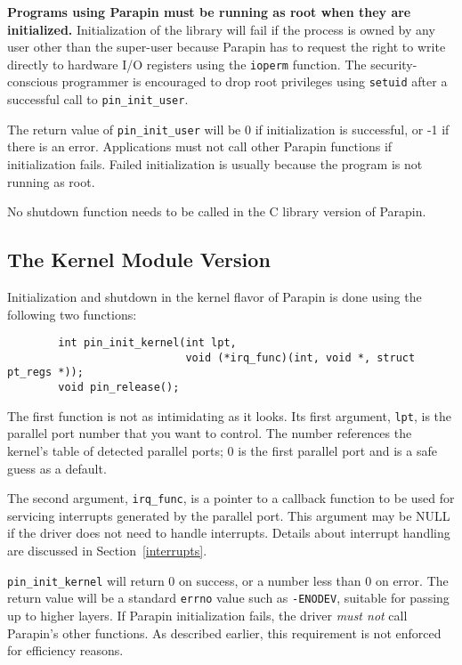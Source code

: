 \documentclass{article}
\begin{document}
{\bf Programs using Parapin must be running as root when they are
initialized.}  Initialization of the library will fail if the process
is owned by any user other than the super-user because Parapin has to
request the right to write directly to hardware I/O registers using
the {\tt ioperm} function.  The security-conscious programmer is
encouraged to drop root privileges using {\tt setuid} after a
successful call to {\tt pin\_init\_user}.

The return value of {\tt pin\_init\_user} will be 0 if initialization
is successful, or -1 if there is an error.  Applications must not call
other Parapin functions if initialization fails.  Failed
initialization is usually because the program is not running as root.

No shutdown function needs to be called in the C library version of
Parapin.


\subsection{The Kernel Module Version}

Initialization and shutdown in the kernel flavor of Parapin is done
using the following two functions:
\begin{verbatim}
        int pin_init_kernel(int lpt,
                            void (*irq_func)(int, void *, struct pt_regs *));
        void pin_release();
\end{verbatim}

The first function is not as intimidating as it looks.  Its first
argument, {\tt lpt}, is the parallel port number that you want to
control.  The number references the kernel's table of detected
parallel ports; 0 is the first parallel port and is a safe guess as a
default.

The second argument, {\tt irq\_func}, is a pointer to a callback
function to be used for servicing interrupts generated by the parallel
port.  This argument may be NULL if the driver does not need to handle
interrupts.  Details about interrupt handling are discussed in
Section~\ref{interrupts}.

{\tt pin\_init\_kernel} will return 0 on success, or a number less
than 0 on error.  The return value will be a standard {\tt errno}
value such as {\tt -ENODEV}, suitable for passing up to higher layers.
If Parapin initialization fails, the driver {\em must not} call
Parapin's other functions.  As described earlier, this requirement is
not enforced for efficiency reasons.
\end{document}
